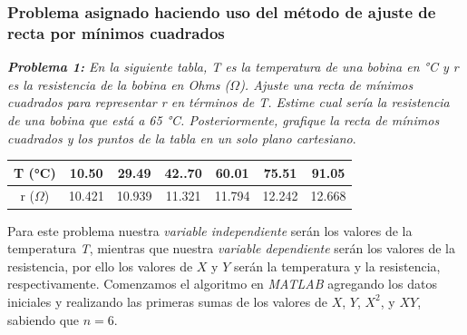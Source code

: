 \documentclass[11pt,letterpaper]{article}
\begin{document}
\subsubsection*{\textcolor{Mahogany}{Problema asignado haciendo uso del método de ajuste de recta por mínimos cuadrados}}
\begin{center}
\textit{\textbf{Problema 1: } En la siguiente tabla, T es la temperatura de una bobina en °C  y r es la resistencia de la bobina en Ohms ($\Omega$). Ajuste una recta de mínimos cuadrados para representar r en términos de T. Estime cual sería la resistencia de una bobina que está a 65 °C. Posteriormente, grafique la recta de mínimos cuadrados y los puntos de la tabla en un solo plano cartesiano}.\linebreak \par
\begin{tabular}{c|cccccc}
 \hline 
 T (°C) & 10.50 & 29.49 & 42..70 & 60.01 & 75.51 & 91.05 \\ 
 \hline 
 r ($\Omega$) & 10.421 & 10.939 & 11.321 & 11.794 & 12.242 & 12.668 \\ 
 \hline 
 \end{tabular} 
\end{center}
Para este problema nuestra \textit{variable independiente} serán los valores de la temperatura \textit{T}, mientras que nuestra \textit{variable dependiente} serán los valores de la resistencia, por ello los valores de $X$ y $Y$ serán la temperatura y la resistencia, respectivamente. Comenzamos el algoritmo en \textit{MATLAB} agregando los datos iniciales y realizando las primeras sumas de los valores de $X$, $Y$,  $X^2$, y $XY$, sabiendo que $n = 6$. 
\end{document}

